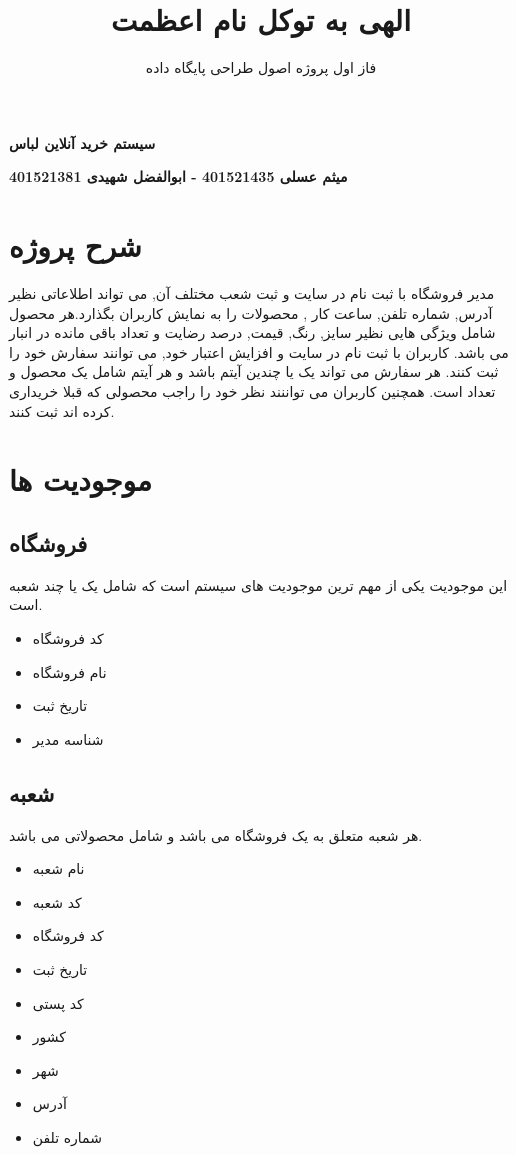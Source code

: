 \documentclass[]{article}
\title{ الهی به توکل نام اعظمت  }
\author{
فاز اول پروژه اصول طراحی پایگاه داده
 }
\begin{document}
\maketitle

\begin{center}
\textbf{سیستم خرید آنلاین لباس}
\end{center}


\begin{center}
\textbf{میثم عسلی 401521435 - ابوالفضل شهیدی 401521381}
\end{center}

\newpage
\tableofcontents
\newpage
\section{شرح پروژه}
مدیر فروشگاه با ثبت نام در سایت و ثبت شعب مختلف آن, می تواند اطلاعاتی نظیر آدرس, شماره تلفن, ساعت کار , محصولات  را به نمایش کاربران بگذارد.هر محصول شامل ویژگی هایی نظیر سایز, رنگ, قیمت, درصد رضایت و تعداد باقی مانده در انبار می باشد. کاربران با ثبت نام در سایت و افزایش  اعتبار خود, می توانند سفارش خود را ثبت کنند.
هر سفارش می تواند یک یا چندین آیتم باشد و هر آیتم شامل یک محصول و تعداد است.
همچنین کاربران می تواننند نظر خود را راجب محصولی که قبلا خریداری کرده اند ثبت کنند. 
\section{موجودیت ها}






\subsection{فروشگاه}
این موجودیت یکی از مهم ترین موجودیت های سیستم است که شامل یک یا چند شعبه است.
\begin{itemize}
\item کد فروشگاه
\item نام فروشگاه
\item تاریخ ثبت  
\item شناسه مدیر

\end{itemize}








\subsection{شعبه}
هر شعبه متعلق به یک فروشگاه می باشد و شامل محصولاتی می باشد.
\begin{itemize}
\item نام شعبه
\item کد شعبه
\item کد فروشگاه
\item تاریخ ثبت  
\item کد پستی
\item کشور
\item شهر
\item آدرس
\item شماره تلفن
\end{itemize}
\end{document}
